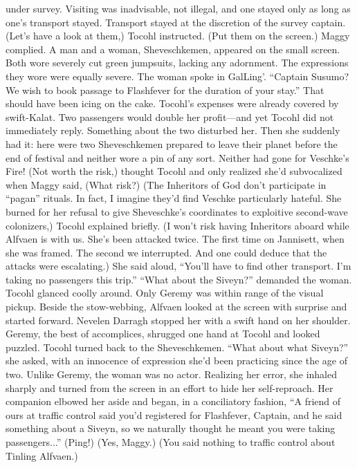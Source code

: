 \documentclass[9pt]{article}
\begin{document}
under survey. Visiting was inadvisable, not illegal, and one stayed only as long as one’s transport stayed.
Transport stayed at the discretion of the survey captain.(Let’s have a look at them,) Tocohl instructed. (Put them on the screen.)
Maggy complied. A man and a woman, Sheveschkemen, appeared on the small screen. Both wore
severely cut green jumpsuits, lacking any adornment. The expressions they wore were equally severe.
The woman spoke in GalLing’. “Captain Susumo? We wish to book passage to Flashfever for the
duration of your stay.”
That should have been icing on the cake. Tocohl’s expenses were already covered by swift-Kalat.
Two passengers would double her profit—and yet Tocohl did not immediately reply. Something about
the two disturbed her. Then she suddenly had it: here were two Sheveschkemen prepared to leave their
planet before the end of festival and neither wore a pin of any sort. Neither had gone for Veschke’s Fire!
(Not worth the risk,) thought Tocohl and only realized she’d subvocalized when Maggy said, (What
risk?)
(The Inheritors of God don’t participate in “pagan” rituals. In fact, I imagine they’d find Veschke
particularly hateful. She burned for her refusal to give Sheveschke’s coordinates to exploitive
second-wave colonizers,) Tocohl explained briefly. (I won’t risk having Inheritors aboard while Alfvaen
is with us. She’s been attacked twice. The first time on Jannisett, when she was framed. The second we
interrupted. And one could deduce that the attacks were escalating.) She said aloud, “You’ll have to find
other transport. I’m taking no passengers this trip.”
“What about the Siveyn?” demanded the woman.
Tocohl glanced coolly around. Only Geremy was within range of the visual pickup. Beside the
stow-webbing, Alfvaen looked at the screen with surprise and started forward. Nevelen Darragh
stopped her with a swift hand on her shoulder.
Geremy, the best of accomplices, shrugged one hand at Tocohl and looked puzzled. Tocohl turned
back to the Sheveschkemen. “What about what Siveyn?” she asked, with an innocence of expression
she’d been practicing since the age of two.
Unlike Geremy, the woman was no actor. Realizing her error, she inhaled sharply and turned from
the screen in an effort to hide her self-reproach.
Her companion elbowed her aside and began, in a conciliatory fashion, “A friend of ours at traffic
control said you’d registered for Flashfever, Captain, and he said something about a Siveyn, so we
naturally thought he meant you were taking passengers...”
(Ping!)
(Yes, Maggy.)
(You said nothing to traffic control about Tinling Alfvaen.)
\end{document}
